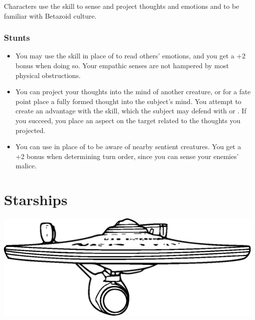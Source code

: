 \documentclass[12pt,titlepage,openany]{book}
\begin{document}
Characters use the  skill to sense and project thoughts and
emotions and to be familiar with Betazoid culture.

\subsection*{ Stunts}\label{subsec:betazoid-powers}

\begin{itemize}
    \item {} You may use the  skill in
        place of  to read others' emotions, and you get a +2
        bonus when doing so. Your empathic senses are not hampered by most
        physical obstructions.

    \item {} You can project your thoughts into the
        mind of another creature, or for a fate point place a fully formed
        thought into the subject's mind. You attempt to create an advantage
        with the  skill, which the subject may defend with
         or . If you succeed, you place an aspect
        on the target related to the thoughts you projected.

    \item {} You can use  in place of
         to be aware of nearby sentient creatures. You get a +2
        bonus when determining turn order, since you can sense your enemies'
        malice.
\end{itemize}



\chapter{Starships}\label{chap:starships}

\begin{center}
    \includegraphics[width=0.8\linewidth]{img/ConstitutionClass.eps}
\end{center}
\end{document}

